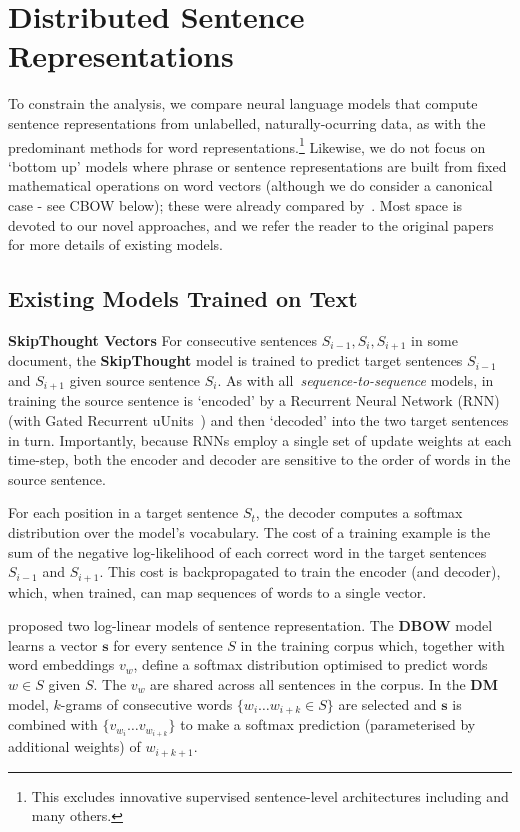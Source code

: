 \documentclass[11pt,letterpaper]{article}
\begin{document}
\section{Distributed Sentence Representations}

To constrain the analysis, we compare neural language models that compute sentence representations from unlabelled, naturally-ocurring data, as with the predominant methods for word representations.\footnote{This excludes innovative supervised sentence-level architectures including \cite{socher2011semi,kalchbrenner2014convolutional} and many others.} Likewise, we do not focus on `bottom up' models where phrase or sentence representations are built from fixed mathematical operations on word vectors (although we do consider a canonical case - see CBOW below); these were already compared by~. Most space is devoted to our novel approaches, and we refer the reader to the original papers for more details of existing models. 

\subsection{Existing Models Trained on Text}
{\bf SkipThought Vectors} For consecutive sentences \(S_{i-1},S_i,S_{i+1}\) in some document, the {\bf SkipThought} model \cite{kiros2015skip} is trained to predict target sentences \(S_{i-1}\) and \(S_{i+1}\) given source sentence \(S_i\). As with all~\emph{sequence-to-sequence} models, in training the source sentence is `encoded' by a Recurrent Neural Network (RNN) (with Gated Recurrent uUnits~\cite{cho2014learning}) and then `decoded' into the two target sentences in turn. Importantly, because RNNs employ a single set of update weights at each time-step, both the encoder and decoder are sensitive to the order of words in the source sentence. 

For each position in a target sentence \(S_t\), the decoder computes a softmax distribution over the model's vocabulary. The cost of a training example is the sum of the negative log-likelihood of each correct word in the target sentences \(S_{i-1}\) and \(S_{i+1}\). This cost is backpropagated to train the encoder (and decoder), which, when trained, can map sequences of words to a single vector.

\vspace{5pt}  proposed two log-linear models of sentence representation. The {\bf DBOW} model learns a vector \(\mathbf{s}\) for every sentence \(S\) in the training corpus which, together with word embeddings \(v_w\), define a softmax distribution optimised to predict words \(w \in S\) given \(S\). The \(v_w\) are shared across all sentences in the corpus. In the {\bf DM} model, \(k\)-grams of consecutive words \(\{w_i \dots w_{i+k} \in S\}\) are selected and \(\mathbf{s}\) is combined with \(\{v_{w_i} \dots v_{w_{i+k}} \}\) to make a softmax prediction (parameterised by additional weights) of \(w_{i+k+1}\). 
\end{document}
